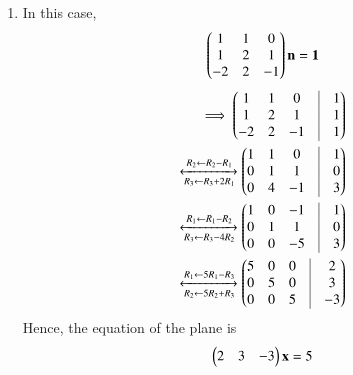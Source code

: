 \begin{enumerate}
\begin{figure}[H]
    \caption{}
     \label{fig:chapters/12/11/3/6/1}
     \end{figure}
     \item  In this case, 
\begin{align}
\begin{pmatrix}1&1&0 \\ 1&2&1 \\ -2&2&-1\end{pmatrix} \mathbf{n}=\mathbf{1}
\end{align}
\begin{align*}
\implies
\myvec{1&1&0&\vrule&1\\1&2&1&\vrule&1\\-2&2&-1&\vrule&1}
\\
\xleftrightarrow[R_3 \leftarrow R_3 + 2R_1]{R_2 \leftarrow R_2 - R_1}
\myvec{1&1&0&\vrule&1\\0&1&1&\vrule&0\\0&4&-1&\vrule&3}
\\
	\xleftrightarrow[R_3 \leftarrow R_3 - 4R_2]{R_1 \leftarrow R_1- R_2}
\myvec{1&0&-1&\vrule&1\\0&1&1&\vrule&0\\0&0&-5&\vrule&3}\\
	\xleftrightarrow[R_2 \leftarrow 5R_2 + R_3]{R_1 \leftarrow 5R_1- R_3}
\myvec{5&0&0&\vrule&2\\0&5&0&\vrule&3\\0&0&5&\vrule&-3}
\end{align*}
Hence, the equation of the plane is
\begin{align}
\begin{pmatrix}2 & 3 & -3\end{pmatrix} \mathbf{x} = 5
\end{align}
\end{enumerate}
